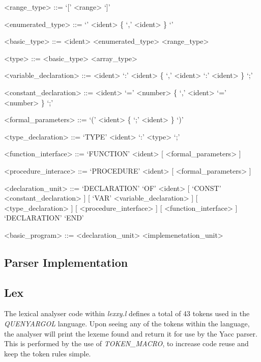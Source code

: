 \documentclass[]{article}
\begin{document}
\begin{grammar}
	<range_type> ::= `[' <range> `]'
	
	<enumerated_type> ::= `{' <ident> \{ `,' <ident> \} `}'
	
	<basic_type> ::= <ident> 
	\alt <enumerated_type>
	\alt <range_type>
	
	<type> ::= <basic_type>
	\alt <array_type>
	
	<variable_declaration> ::= <ident> `:' <ident> \{ `,' <ident> `:' <ident> \} `;'
	
	<constant_declaration> ::= <ident> `=' <number> \{ `,' <ident> `=' <number> \} `;'
	
	<formal_parameters> ::= `(' <ident> \{ `;' <ident> \} `)'
	
	<type_declaration> ::= `TYPE' <ident> `:' <type> `;'
	
	<function_interface> ::= `FUNCTION' <ident> [ <formal_parameters> ]
	
	<procedure_interace> ::= `PROCEDURE' <ident> [ <formal_parameters> ]
	
	<declaration_unit> ::= `DECLARATION' `OF' <ident>
    [ `CONST' <constant_declaration> ]
	[ `VAR' <variable_declaration> ]
	[ <type_declaration> ]
	[ <procedure_interface> ]
	[ <function_interface> ]
	`DECLARATION' `END'
	
	<basic_program> ::= <declaration_unit> <implemenetation_unit>
	
\end{grammar}
\vspace{0.5cm}


\newpage
\begin{center}
	\section*{Parser Implementation}
\end{center}
\vspace{1cm}

\subsection*{Lex}
\vspace{0.5cm}

The lexical analyser code within \textit{lexxy.l} defines a total of 43 tokens used in the \textit{QUENYARGOL} language. Upon seeing any of the tokens within the language, the analyser will print the lexeme found and return it for use by the Yacc parser. This is performed by the use of \textit{TOKEN_MACRO}, to increase code reuse and keep the token rules simple.\\
\end{document}
